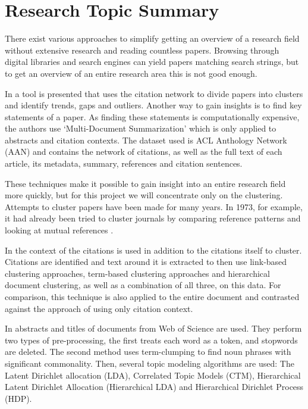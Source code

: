 \section{Research Topic Summary}
There exist various approaches to simplify getting an overview of a research field without extensive research and reading countless papers. Browsing through digital libraries and search engines can yield papers matching search strings, but to get an overview of an entire research area this is not good enough.

In \cite{Rapid_understanding_of_scientific_paper_collections} a tool is presented that uses the citation network to divide papers into clusters and identify trends, gaps and outliers.
Another way to gain insights is to find key statements of a paper. As finding these statements is computationally expensive, the authors use `Multi-Document Summarization' which is only applied to abstracts and citation contexts. The dataset used is ACL Anthology Network (AAN) \cite{aan} and contains the network of citations, as well as the full text of each article, its metadata, summary, references and citation sentences.

These techniques make it possible to gain insight into an entire research field more quickly, but for this project we will concentrate only on the clustering.
Attempts to cluster papers have been made for many years. In 1973, for example, it had already been tried to cluster journals by comparing reference patterns and looking at mutual references \cite{Clustering_of_scientific_journals}.

In \cite{Document_clustering_of_scientific_texts_using_citation_contexts} the context of the citations is used in addition to the citations itself to cluster.
Citations are identified and text around it is extracted to then use link-based clustering approaches, term-based clustering approaches and hierarchical document clustering, as well as a combination of all three, on this data.
For comparison, this technique is also applied to the entire document and contrasted against the approach of using only citation context.

In \cite{Clustering_scientific_documents_with_topic_modeling} abstracts and titles of documents from Web of Science \cite{web_of_science} are used.
They perform two types of pre-processing, the first treats each word as a token, and stopwords are deleted. The second method uses term-clumping to find noun phrases with significant commonality.
Then, several topic modeling algorithms are used: The Latent Dirichlet allocation (LDA), Correlated Topic Models (CTM), Hierarchical Latent Dirichlet Allocation (Hierarchical LDA) and Hierarchical Dirichlet Process (HDP).

